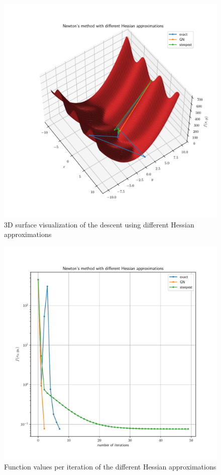 \documentclass[oneside, a4paper]{book}
\begin{document}
\begin{figure}[H]
    \centering
    \includegraphics[width=\linewidth]{3d.pdf}
    \caption{3D surface visualization of the descent using different Hessian approximations}
    \label{fig:3d}
\end{figure}

\begin{figure}[H]
  \centering
  \includegraphics[width=\linewidth]{value.pdf}
  \caption{Function values per iteration of the different Hessian approximations}
  \label{fig:value}
\end{figure}
\end{document}
